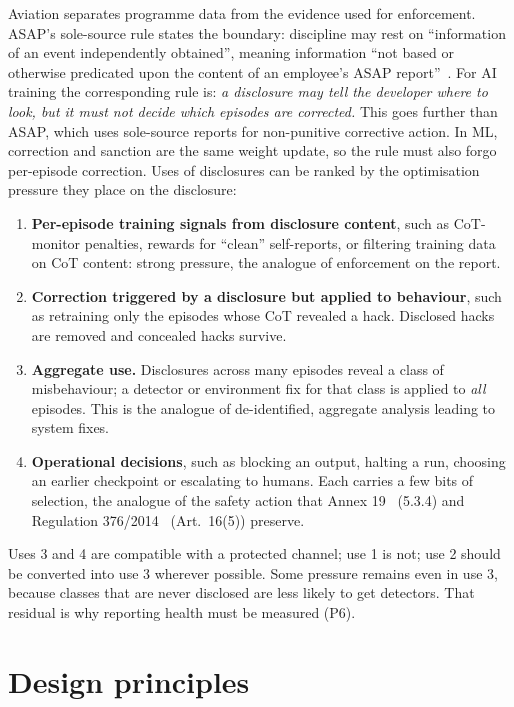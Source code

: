 \documentclass[11pt]{article}
\begin{document}
Aviation separates programme data from the evidence used for enforcement. ASAP's sole-source rule states the boundary: discipline may rest on ``information of an event independently obtained'', meaning information ``not based or otherwise predicated upon the content of an employee's ASAP report''~\cite[para.~16.4, Note]{faa2020}. For AI training the corresponding rule is: \emph{a disclosure may tell the developer where to look, but it must not decide which episodes are corrected.} This goes further than ASAP, which uses sole-source reports for non-punitive corrective action. In ML, correction and sanction are the same weight update, so the rule must also forgo per-episode correction. Uses of disclosures can be ranked by the optimisation pressure they place on the disclosure:

\begin{enumerate}
\item \textbf{Per-episode training signals from disclosure content}, such as CoT-monitor penalties, rewards for ``clean'' self-reports, or filtering training data on CoT content: strong pressure, the analogue of enforcement on the report.
\item \textbf{Correction triggered by a disclosure but applied to behaviour}, such as retraining only the episodes whose CoT revealed a hack. Disclosed hacks are removed and concealed hacks survive.
\item \textbf{Aggregate use.} Disclosures across many episodes reveal a class of misbehaviour; a detector or environment fix for that class is applied to \emph{all} episodes. This is the analogue of de-identified, aggregate analysis leading to system fixes.
\item \textbf{Operational decisions}, such as blocking an output, halting a run, choosing an earlier checkpoint or escalating to humans. Each carries a few bits of selection, the analogue of the safety action that Annex 19~\cite{icao2016} (5.3.4) and Regulation 376/2014~\cite{eu376} (Art.~16(5)) preserve.
\end{enumerate}

Uses 3 and 4 are compatible with a protected channel; use 1 is not; use 2 should be converted into use 3 wherever possible. Some pressure remains even in use 3, because classes that are never disclosed are less likely to get detectors. That residual is why reporting health must be measured (P6).

\section{Design principles}\label{sec:principles}
\end{document}
